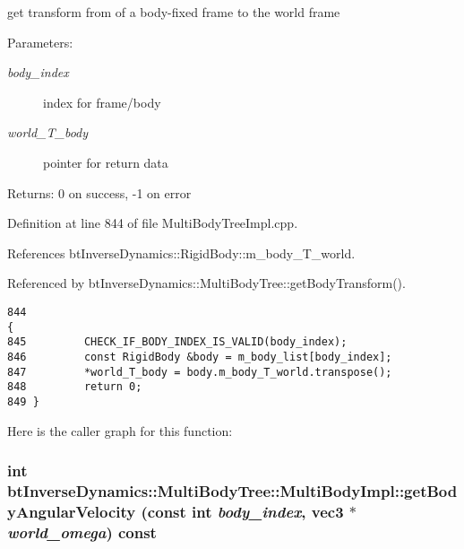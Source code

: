 get transform from of a body-fixed frame to the world frame \begin{Desc}
\item[Parameters:]
\begin{description}
\item[{\em body\_\-index}]index for frame/body \item[{\em world\_\-T\_\-body}]pointer for return data \end{description}
\end{Desc}
\begin{Desc}
\item[Returns:]0 on success, -1 on error \end{Desc}
 

Definition at line 844 of file MultiBodyTreeImpl.cpp.

References btInverseDynamics::RigidBody::m\_\-body\_\-T\_\-world.

Referenced by btInverseDynamics::MultiBodyTree::getBodyTransform().

\begin{Code}\begin{verbatim}844                                                                                           {
845         CHECK_IF_BODY_INDEX_IS_VALID(body_index);
846         const RigidBody &body = m_body_list[body_index];
847         *world_T_body = body.m_body_T_world.transpose();
848         return 0;
849 }
\end{verbatim}
\end{Code}




Here is the caller graph for this function:\hypertarget{classbt_inverse_dynamics_1_1_multi_body_tree_1_1_multi_body_impl_82fbc5d66ecc8e9392f4cf62ec5bf239}{
\subsubsection[getBodyAngularVelocity]{\setlength{\rightskip}{0pt plus 5cm}int btInverseDynamics::MultiBodyTree::MultiBodyImpl::getBodyAngularVelocity (const int {\em body\_\-index}, \/  {\bf vec3} $\ast$ {\em world\_\-omega}) const}}
\label{classbt_inverse_dynamics_1_1_multi_body_tree_1_1_multi_body_impl_82fbc5d66ecc8e9392f4cf62ec5bf239}


